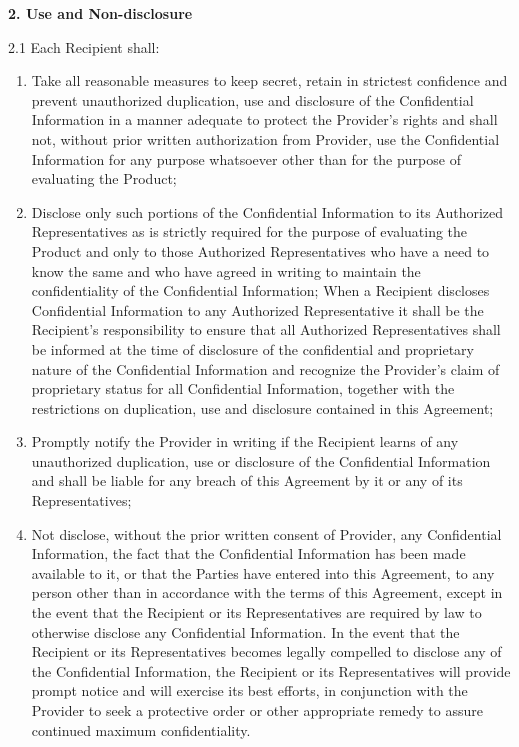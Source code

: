 \documentclass[11pt,a4paper]{article} %
\begin{document}
\textbf{2. Use and Non-disclosure}

2.1 Each Recipient shall:

\begin{enumerate}
\def\labelenumi{(\alph{enumi})}
\item
  Take all reasonable measures to keep secret, retain in strictest
  confidence and prevent unauthorized duplication, use and disclosure of
  the Confidential Information in a manner adequate to protect the
  Provider's rights and shall not, without prior written authorization
  from Provider, use the Confidential Information for any purpose
  whatsoever other than for the purpose of evaluating the Product;
\item
  Disclose only such portions of the Confidential Information to its
  Authorized Representatives as is strictly required for the purpose of
  evaluating the Product and only to those Authorized Representatives
  who have a need to know the same and who have agreed in writing to
  maintain the confidentiality of the Confidential Information; When a
  Recipient discloses Confidential Information to any Authorized
  Representative it shall be the Recipient's responsibility to ensure
  that all Authorized Representatives shall be informed at the time of
  disclosure of the confidential and proprietary nature of the
  Confidential Information and recognize the Provider's claim of
  proprietary status for all Confidential Information, together with the
  restrictions on duplication, use and disclosure contained in this
  Agreement;
\item
  Promptly notify the Provider in writing if the Recipient learns of any
  unauthorized duplication, use or disclosure of the Confidential
  Information and shall be liable for any breach of this Agreement by it
  or any of its Representatives;
\item
  Not disclose, without the prior written consent of Provider, any
  Confidential Information, the fact that the Confidential Information
  has been made available to it, or that the Parties have entered into
  this Agreement, to any person other than in accordance with the terms
  of this Agreement, except in the event that the Recipient or its
  Representatives are required by law to otherwise disclose any
  Confidential Information. In the event that the Recipient or its
  Representatives becomes legally compelled to disclose any of the
  Confidential Information, the Recipient or its Representatives will
  provide prompt notice and will exercise its best efforts, in
  conjunction with the Provider to seek a protective order or other
  appropriate remedy to assure continued maximum confidentiality.
\end{enumerate}
\end{document}
